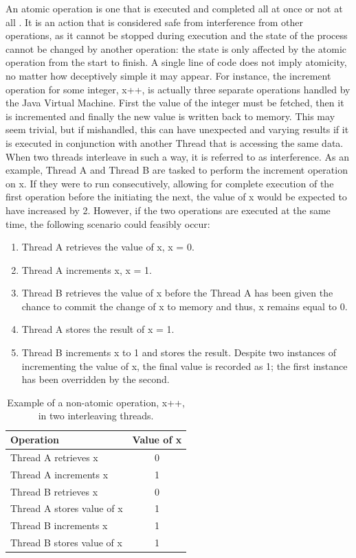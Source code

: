 \documentclass[a4paper,12pt]{article}
\begin{document}
An atomic operation is one that is executed and completed all at once or not at all \citep{oracle19}. It is an action that is considered safe from interference from other operations, as it cannot be stopped during execution and the state of the process cannot be changed by another operation: the state is only affected by the atomic operation from the start to finish. A single line of code does not imply atomicity, no matter how deceptively simple it may appear. For instance, the increment operation for some integer, x++, is actually three separate operations handled by the Java Virtual Machine. First the value of the integer must be fetched, then it is incremented and finally the new value is written back to memory. This may seem trivial, but if mishandled, this can have unexpected and varying results if it is executed in conjunction with another Thread that is accessing the same data. When two threads interleave in such a way, it is referred to as interference. As an example, Thread A and Thread B are tasked to perform the increment operation on x. If they were to run consecutively, allowing for complete execution of the first operation before the initiating the next, the value of x would be expected to have increased by 2. However, if the two operations are executed at the same time, the following scenario could feasibly occur:
\begin{enumerate}
    \item Thread A retrieves the value of x, x = 0.
    \item Thread A increments x, x = 1.
    \item Thread B retrieves the value of x before the Thread A has been given the chance to commit the change of x to memory and thus, x remains equal to 0.
    \item Thread A stores the result of x = 1.
    \item Thread B increments x to 1 and stores the result. Despite two instances of incrementing the value of x, the final value is recorded as 1; the first instance has been overridden by the second.
\end{enumerate}

\begin{table}[]
    \centering
    \begin{tabular}{||l c||} 
     \hline
     Operation & Value of x  \\ 
     \hline\hline
     Thread A retrieves x & 0 \\ 
     \hline
     Thread A increments x & 1  \\
     \hline
     Thread B retrieves x & 0 \\
     \hline
     Thread A stores value of x & 1 \\
     \hline
     Thread B increments x & 1 \\  
     \hline
     Thread B stores value of x & 1 \\
     \hline
    \end{tabular}
    \caption{Example of a non-atomic operation, x++, in two interleaving threads.}
    \label{table:non-atomic}
\end{table}
\end{document}
